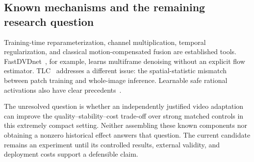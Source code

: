 \subsection{Known mechanisms and the remaining research question}
Training-time reparameterization, channel multiplication, temporal
regularization, and classical motion-compensated fusion are established
tools. FastDVDnet~\cite{fastdvdnet}, for example, learns multiframe denoising
without an explicit flow estimator. TLC~\cite{tlc} addresses a different issue:
the spatial-statistic mismatch between patch training and whole-image
inference. Learnable safe rational activations also have clear
precedents~\cite{pau}.

The unresolved question is whether an independently justified video
adaptation can improve the quality--stability--cost trade-off over strong
matched controls in this extremely compact setting. Neither assembling these
known components nor obtaining a nonzero historical effect answers that
question. The current candidate remains an experiment until its controlled
results, external validity, and deployment costs support a defensible claim.
